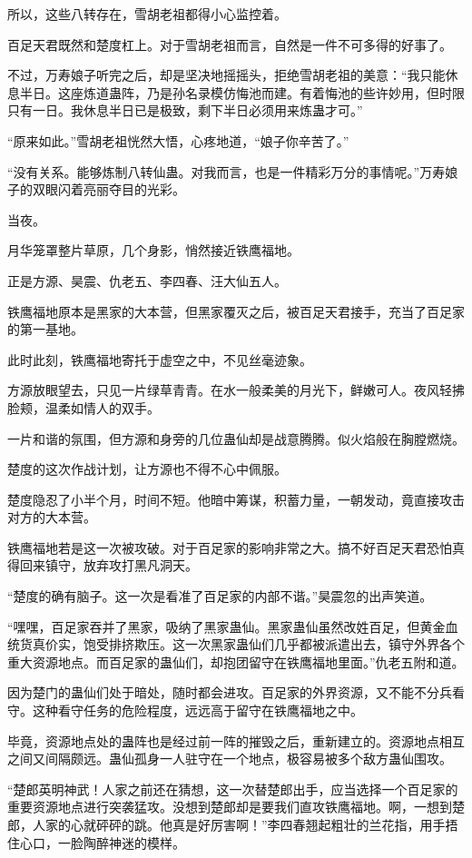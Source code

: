 \begin{this_body}
所以，这些八转存在，雪胡老祖都得小心监控着。

百足天君既然和楚度杠上。对于雪胡老祖而言，自然是一件不可多得的好事了。

不过，万寿娘子听完之后，却是坚决地摇摇头，拒绝雪胡老祖的美意：“我只能休息半日。这座炼道蛊阵，乃是孙名录模仿悔池而建。有着悔池的些许妙用，但时限只有一日。我休息半日已是极致，剩下半日必须用来炼蛊才可。”

“原来如此。”雪胡老祖恍然大悟，心疼地道，“娘子你辛苦了。”

“没有关系。能够炼制八转仙蛊。对我而言，也是一件精彩万分的事情呢。”万寿娘子的双眼闪着亮丽夺目的光彩。

当夜。

月华笼罩整片草原，几个身影，悄然接近铁鹰福地。

正是方源、昊震、仇老五、李四春、汪大仙五人。

铁鹰福地原本是黑家的大本营，但黑家覆灭之后，被百足天君接手，充当了百足家的第一基地。

此时此刻，铁鹰福地寄托于虚空之中，不见丝毫迹象。

方源放眼望去，只见一片绿草青青。在水一般柔美的月光下，鲜嫩可人。夜风轻拂脸颊，温柔如情人的双手。

一片和谐的氛围，但方源和身旁的几位蛊仙却是战意腾腾。似火焰般在胸膛燃烧。

楚度的这次作战计划，让方源也不得不心中佩服。

楚度隐忍了小半个月，时间不短。他暗中筹谋，积蓄力量，一朝发动，竟直接攻击对方的大本营。

铁鹰福地若是这一次被攻破。对于百足家的影响非常之大。搞不好百足天君恐怕真得回来镇守，放弃攻打黑凡洞天。

“楚度的确有脑子。这一次是看准了百足家的内部不谐。”昊震忽的出声笑道。

“嘿嘿，百足家吞并了黑家，吸纳了黑家蛊仙。黑家蛊仙虽然改姓百足，但黄金血统货真价实，饱受排挤欺压。这一次黑家蛊仙们几乎都被派遣出去，镇守外界各个重大资源地点。而百足家的蛊仙们，却抱团留守在铁鹰福地里面。”仇老五附和道。

因为楚门的蛊仙们处于暗处，随时都会进攻。百足家的外界资源，又不能不分兵看守。这种看守任务的危险程度，远远高于留守在铁鹰福地之中。

毕竟，资源地点处的蛊阵也是经过前一阵的摧毁之后，重新建立的。资源地点相互之间又间隔颇远。蛊仙孤身一人驻守在一个地点，极容易被多个敌方蛊仙围攻。

“楚郎英明神武！人家之前还在猜想，这一次替楚郎出手，应当选择一个百足家的重要资源地点进行突袭猛攻。没想到楚郎却是要我们直攻铁鹰福地。啊，一想到楚郎，人家的心就砰砰的跳。他真是好厉害啊！”李四春翘起粗壮的兰花指，用手捂住心口，一脸陶醉神迷的模样。


\end{this_body}
